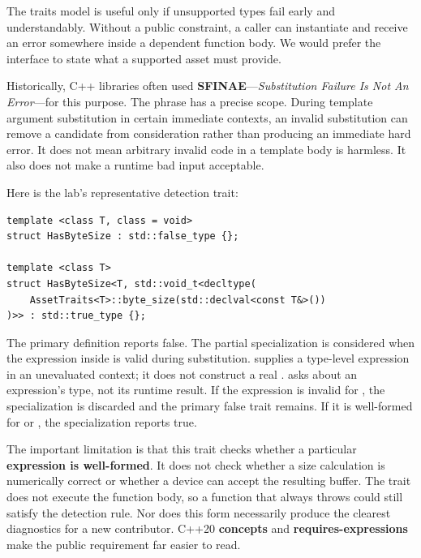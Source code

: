 The traits model is useful only if unsupported types fail early and understandably. Without a public constraint, a caller can instantiate  and receive an error somewhere inside a dependent function body. We would prefer the interface to state what a supported asset must provide.

Historically, C++ libraries often used \textbf{SFINAE}---\emph{Substitution Failure Is Not An Error}---for this purpose. The phrase has a precise scope. During template argument substitution in certain immediate contexts, an invalid substitution can remove a candidate from consideration rather than producing an immediate hard error. It does not mean arbitrary invalid code in a template body is harmless. It also does not make a runtime bad input acceptable.

Here is the lab's representative detection trait:

\begin{verbatim}
template <class T, class = void>
struct HasByteSize : std::false_type {};

template <class T>
struct HasByteSize<T, std::void_t<decltype(
    AssetTraits<T>::byte_size(std::declval<const T&>())
)>> : std::true_type {};
\end{verbatim}

The primary definition reports false. The partial specialization is considered when the expression inside  is valid during substitution.  supplies a type-level expression in an unevaluated context; it does not construct a real .  asks about an expression's type, not its runtime result. If the expression is invalid for , the specialization is discarded and the primary false trait remains. If it is well-formed for  or , the specialization reports true.

The important limitation is that this trait checks whether a particular \textbf{expression is well-formed}. It does not check whether a size calculation is numerically correct or whether a device can accept the resulting buffer. The trait does not execute the function body, so a function that always throws could still satisfy the detection rule. Nor does this form necessarily produce the clearest diagnostics for a new contributor. C++20 \textbf{concepts} and \textbf{requires-expressions} make the public requirement far easier to read.

